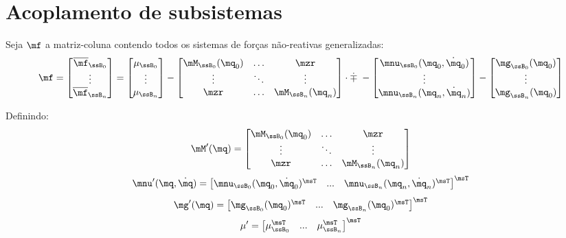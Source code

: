 \documentclass[]{politex}
\begin{document}
\section{Acoplamento de subsistemas} \label{S05-03-03}

Seja $\mf$ a matriz-coluna contendo todos os sistemas de forças não-reativas generalizadas:
\begin{equation} \label{eq:fParalelos}
\mf = 
\begin{bmatrix}
\overline{\mf}_{\ssB_0} \\
\vdots \\
\overline{\mf}_{\ssB_n}  
\end{bmatrix}
=
\begin{bmatrix}
\mu_{\ssB_0} \\
\vdots \\
\mu_{\ssB_n} 
\end{bmatrix}
-
\begin{bmatrix}
\mM_{\ssB_0}(\mq_0) & \ldots & \mzr\\
\vdots & \ddots & \vdots\\
\mzr &\ldots  & \mM_{\ssB_n}(\mq_n)
\end{bmatrix}
\cdot
\dot{\mp} \;
-
\begin{bmatrix}
\mnu_{\ssB_0}(\mq_0,\dot{\mq}_0) \\
\vdots \\
\mnu_{\ssB_n}(\mq_n,\dot{\mq}_n)  
\end{bmatrix}
-
\begin{bmatrix}
\mg_{\ssB_0}(\mq_0) \\
\vdots \\
\mg_{\ssB_n}(\mq_0)  
\end{bmatrix}
\end{equation}

Definindo:
\begin{equation}
\mM'(\mq) =
\begin{bmatrix}
\mM_{\ssB_0}(\mq_0) & \ldots & \mzr\\
\vdots & \ddots & \vdots\\
\mzr &\ldots  & \mM_{\ssB_n}(\mq_n)
\end{bmatrix}
\end{equation}
\begin{equation}
\mnu'(\mq,\dot{\mq}) =
\begin{bmatrix}
\mnu_{\ssB_0}(\mq_0,\dot{\mq}_0)^\msT &
... &
\mnu_{\ssB_n}(\mq_n,\dot{\mq}_n)^\msT
\end{bmatrix}^\msT
\end{equation}
\begin{equation}
\mg'(\mq) =
\begin{bmatrix}
\mg_{\ssB_0}(\mq_0)^\msT &
... &
\mg_{\ssB_n}(\mq_0)^\msT  
\end{bmatrix}^\msT
\end{equation}
\begin{equation}
\mu' =
\begin{bmatrix}
\mu_{\ssB_0}^\msT &
... &
\mu_{\ssB_n}^\msT  
\end{bmatrix}^\msT
\end{equation}
\end{document}
